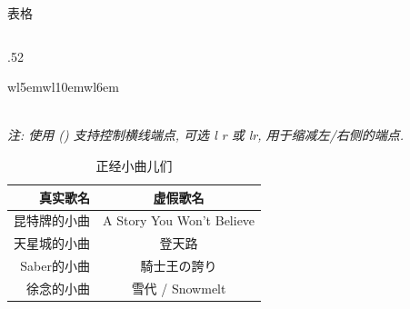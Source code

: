 \begin{frame}{表格}
\begin{columns}[T, onlytextwidth]
\begin{column}{.52\textwidth}
\begin{tabular}{w{l}{5em}w{l}{10em}w{l}{6em}}
			\end{tabular}\\[.5ex]
			\textit{注: 使用 \textup{()} 支持控制横线端点, \textup{} 可选 \textup{\ttfamily l} \textup{\ttfamily r} 或 \textup{\ttfamily lr}, 用于缩减左/右侧的端点.}\\[-2.5ex]
			\begin{table}[h]
				\centering
				\caption{正经小曲儿们}\label{tab:Music}\vspace*{-.5ex}
				\begin{tabular}{rc}
					\toprule
					真实歌名 & 虚假歌名 \\
					\midrule
					昆特牌的小曲 & A Story You Won't Believe \\
					天星城的小曲 & 登天路 \\
					Saber的小曲 & 騎士王の誇り \\
					徐念的小曲 & 雪代 / Snowmelt \\
					\bottomrule
				\end{tabular}
			\end{table}
			\vspace*{-1ex}
		\end{column}
	\end{columns}
\end{frame}

